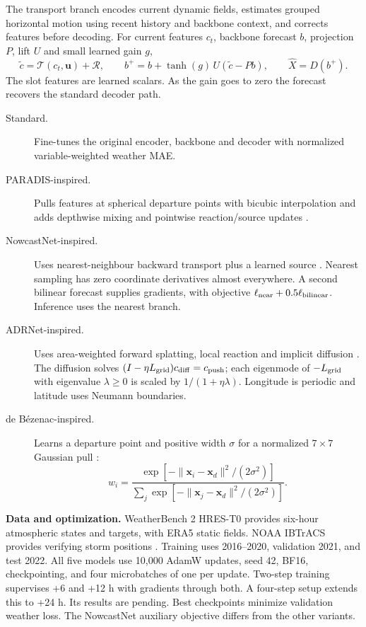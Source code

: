 \documentclass[10pt,a4paper]{article}
\begin{document}
The transport branch encodes current dynamic fields, estimates grouped horizontal motion using recent history and backbone context, and corrects features before decoding. For current features \(c_t\), backbone forecast \(b\), projection \(P\), lift \(U\) and small learned gain \(g\),
\[
 \widetilde c=\mathcal T(c_t,\boldsymbol u)+\mathcal R,\qquad
 b^+=b+\tanh(g)\,U(\widetilde c-Pb),\qquad\widehat X=D(b^+).
\]
The slot features are learned scalars. As the gain goes to zero the forecast recovers the standard decoder path.

\begin{description}
\item[Standard.] Fine-tunes the original encoder, backbone and decoder with normalized variable-weighted weather MAE.
\item[PARADIS-inspired.] Pulls features at spherical departure points with bicubic interpolation and adds depthwise mixing and pointwise reaction/source updates \cite{paradis}.
\item[NowcastNet-inspired.] Uses nearest-neighbour backward transport plus a learned source \cite{nowcast}. Nearest sampling has zero coordinate derivatives almost everywhere. A second bilinear forecast supplies gradients, with objective \(\ell_{\rm near}+0.5\ell_{\rm bilinear}\). Inference uses the nearest branch.
\item[ADRNet-inspired.] Uses area-weighted forward splatting, local reaction and implicit diffusion \cite{adr}. The diffusion solves \((I-\eta L_{\rm grid})c_{\rm diff}=c_{\rm push}\); each eigenmode of \(-L_{\rm grid}\) with eigenvalue \(\lambda\ge0\) is scaled by \(1/(1+\eta\lambda)\). Longitude is periodic and latitude uses Neumann boundaries.
\item[de B\'ezenac-inspired.] Learns a departure point and positive width \(\sigma\) for a normalized \(7\times7\) Gaussian pull \cite{bezenac}:
\[
 w_i=\frac{\exp[-\|\boldsymbol x_i-\boldsymbol x_d\|^2/(2\sigma^2)]}
 {\sum_j\exp[-\|\boldsymbol x_j-\boldsymbol x_d\|^2/(2\sigma^2)]}.
\]
\end{description}

\textbf{Data and optimization.} WeatherBench 2 HRES-T0 provides six-hour atmospheric states and targets, with ERA5 static fields. NOAA IBTrACS provides verifying storm positions \cite{wb,ibtracs}. Training uses 2016--2020, validation 2021, and test 2022. All five models use 10,000 AdamW updates, seed 42, BF16, checkpointing, and four microbatches of one per update. Two-step training supervises +6 and +12 h with gradients through both. A four-step setup extends this to +24 h. Its results are pending. Best checkpoints minimize validation weather loss. The NowcastNet auxiliary objective differs from the other variants.
\end{document}
